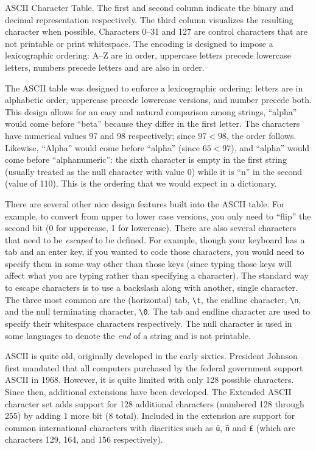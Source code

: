 \begin{table}
\centering

\caption[ASCII Character Table]{ASCII Character Table.  The first and second
column indicate the binary and decimal representation respectively.  The third column
visualizes the resulting character when possible.  Characters 0--31 and 127 are
control characters that are not printable or print whitespace.  The encoding is
designed to impose a lexicographic ordering: A--Z are in order, uppercase letters
precede lowercase letters, numbers precede letters and are also in order.}
\label{table:asciiTable}
\end{table}

The ASCII table was designed to enforce a lexicographic ordering: letters are in alphabetic
order, uppercase precede lowercase versions, and number precede both.  This
design allows for an easy and natural comparison among strings, ``alpha''
would come before ``beta'' because they differ in the first letter.  The characters
have numerical values 97 and 98 respectively; since $97 < 98$, the order follows.
Likewise, ``Alpha'' would come before ``alpha'' (since $65 < 97$), and ``alpha''
would come before ``alphanumeric'': the sixth character is empty in the first string
(usually treated as the null character with value 0) while it is ``n'' in the second (value of 110).
This is the ordering that we would expect in a dictionary.

There are several other nice design features built into the ASCII table.  For example, 
to convert from upper to lower case versions, you only need to ``flip'' the second bit
(0 for uppercase, 1 for lowercase).  There are also several characters that need to be
\emph{escaped} to be defined.  For example, though your keyboard has a tab and an
enter key, if you wanted to code those characters, you would need to specify them
in some way other than those keys (since typing those keys will affect what you are
typing rather than specifying a character).  The standard way to escape characters
is to use a backslash along with another, single character.  The three most common
are the (horizontal) tab, \verb|\t|, the endline character, \verb|\n|, and the null
terminating character, \verb|\0|.  The tab and endline character are used to 
specify their whitespace characters respectively.  The null character is used
in some languages to denote the \emph{end} of a string and is not printable.

ASCII is quite old, originally developed in the early sixties.  President Johnson first
mandated that all computers purchased by the federal government support ASCII in 1968.
However, it is quite limited with only 128 possible characters.  Since then, additional 
extensions have been developed.  The Extended ASCII character set adds support
for 128 additional characters (numbered 128 through 255) by adding 1 more bit (8
total).  Included in the extension are support for common international characters with
diacritics such as \texttt{\"{u}}, \texttt{\~{n}} and \texttt{\pounds} (which are characters
129, 164, and 156 respectively).

